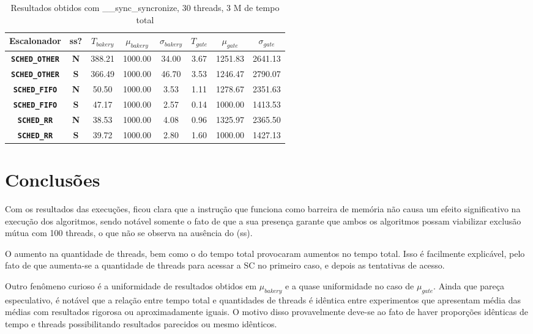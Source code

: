 \documentclass[12pt]{article}
\begin{document}
\begin{center}
	\begin{table}[h]
      \begin{tabular}{|cc|ccc|ccc|}
          \hline
            Escalonador  & ss? & $T_{bakery}$ & $\mu_{bakery}$ & $\sigma_{bakery}$ & $T_{gate}$ & $\mu_{gate}$ & $\sigma_{gate}$ \\ \hline \hline
            \texttt{\textbf{SCHED\_OTHER}}& \textbf{N} & 388.21 & 1000.00 & 34.00 & 3.67 & 1251.83 & 2641.13  \\
            \texttt{\textbf{SCHED\_OTHER}}& \textbf{S} & 366.49 & 1000.00 & 46.70 & 3.53 & 1246.47 & 2790.07  \\ \hline \hline
             \texttt{\textbf{SCHED\_FIFO}}& \textbf{N} & 50.50 & 1000.00 & 3.53 & 1.11 & 1278.67 & 2351.63  \\
            \texttt{\textbf{SCHED\_FIFO}}& \textbf{S} & 47.17 & 1000.00 & 2.57 & 0.14 & 1000.00 & 1413.53  \\ \hline \hline
             \texttt{\textbf{SCHED\_RR}}& \textbf{N} & 38.53 & 1000.00 & 4.08 & 0.96 & 1325.97 & 2365.50  \\
            \texttt{\textbf{SCHED\_RR}}& \textbf{S} & 39.72 & 1000.00 & 2.80 & 1.60 & 1000.00 & 1427.13  \\ \hline \hline
    	\end{tabular}
        \caption{Resultados obtidos com \_\_sync\_syncronize, 30 threads, 3 M de tempo total}
        \label{escalador}
	\end{table}
\end{center}

\section{Conclusões}

Com os resultados das execuções, ficou clara que a instrução que funciona como barreira de memória não causa um efeito significativo na execução dos algoritmos, sendo notável somente o fato de que a sua presença garante que ambos os algoritmos possam viabilizar exclusão mútua com 100 threads, o que não se observa na ausência do (ss). 

O aumento na quantidade de threads, bem como o do tempo total provocaram aumentos no tempo total. Isso é facilmente explicável, pelo fato de que aumenta-se a quantidade de threads para acessar a SC no primeiro caso, e depois as tentativas de acesso. 

Outro fenômeno curioso é a uniformidade de resultados obtidos em $\mu_{bakery}$ e a quase uniformidade no caso de $\mu_{gate}$. Ainda que pareça especulativo, é notável que a relação entre tempo total e quantidades de threads é idêntica entre experimentos que apresentam média das médias com resultados rigorosa ou aproximadamente iguais. O motivo disso provavelmente deve-se ao fato de haver proporções idênticas de tempo e threads possibilitando resultados parecidos ou mesmo idênticos.
\end{document}
